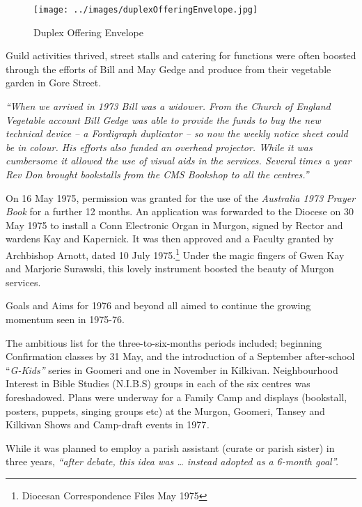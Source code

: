 \begin{figure}
\begin{center}
\texttt{[image: ../images/duplexOfferingEnvelope.jpg]}
\caption{Duplex Offering Envelope}
\end{center}
\end{figure}




Guild activities thrived, street stalls and catering for functions were often boosted through the efforts of Bill and May Gedge and produce from their vegetable garden in Gore Street.



\emph{``When we arrived in 1973 Bill was a widower. From the Church of England Vegetable account Bill Gedge was able to provide the funds to buy the new technical device -- a Fordigraph duplicator -- so now the weekly notice sheet could be in colour. His efforts also funded an overhead projector. While it was cumbersome it allowed the use of visual aids in the services. Several times a year Rev Don brought bookstalls from the CMS Bookshop to all the centres.''}



On 16 May 1975, permission was granted for the use of the \emph{Australia 1973 Prayer Book} for a further 12 months. An application was forwarded to the Diocese on 30 May 1975 to install a Conn Electronic Organ in Murgon, signed by Rector and wardens Kay and Kapernick. It was then approved and a Faculty granted by Archbishop Arnott, dated 10 July 1975.\footnote{Diocesan Correspondence Files May 1975} Under the magic fingers of Gwen Kay and Marjorie Surawski, this lovely instrument boosted the beauty of Murgon services.


Goals and Aims for 1976 and beyond all aimed to continue the growing momentum seen in 1975-76.



The ambitious list for the three-to-six-months periods included; beginning Confirmation classes by 31 May, and the introduction of a September after-school ``\emph{G-Kids''} series in Goomeri and one in November in Kilkivan. Neighbourhood Interest in Bible Studies (N.I.B.S) groups in each of the six centres was foreshadowed. Plans were underway for a Family Camp and displays (bookstall, posters, puppets, singing groups etc) at the Murgon, Goomeri, Tansey and Kilkivan Shows and Camp-draft events in 1977\emph{.}



While it was planned to employ a parish assistant (curate or parish sister) in three years, \emph{``after debate, this idea was \ldots{} instead adopted as a 6-month goal''.}



